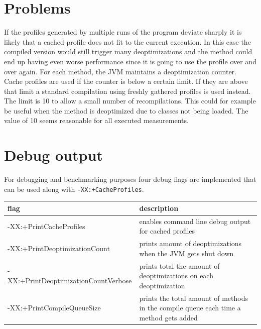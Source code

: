\section{Problems}
\label{s:problems}
If the profiles generated by multiple runs of the program deviate sharply it is likely that a cached profile does not fit to the current execution. In this case the compiled version would still trigger many deoptimizations and the method could end up having even worse performance since it is going to use the profile over and over again.
For each method, the JVM maintains a deoptimization counter. Cache profiles are used if the counter is below a certain limit. If they are above that limit a standard compilation using freshly gathered profiles is used instead.
The limit is 10 to allow a small number of recompilations. This could for example be useful when the method is deoptimized due to classes not being loaded. The value of 10 seems reasonable for all executed measurements.
\section{Debug output}
\label{s:debugoutput}
For debugging and benchmarking purposes four debug flags are implemented that can be used along with \texttt{-XX:+CacheProfiles}.
\begin{table}[ht]
  \centering
  \label{t:debugflags}
  \begin{center}
    \begin{tabular}{| l | p{9.0cm} |}
       \hline
       \textbf{flag} & \textbf{description} \\ \hline\hline
       -XX:+PrintCacheProfiles & enables command line debug output for cached profiles\\ \hline
       -XX:+PrintDeoptimizationCount & prints amount of deoptimizations when the JVM gets shut down\\ \hline
       -XX:+PrintDeoptimizationCountVerbose & prints total the amount of deoptimizations on each deoptimization\\ \hline
       -XX:+PrintCompileQueueSize & prints the total amount of methods in the compile queue each time a method gets added \\ \hline
    \end{tabular}
  \end{center}
\end{table}

 
